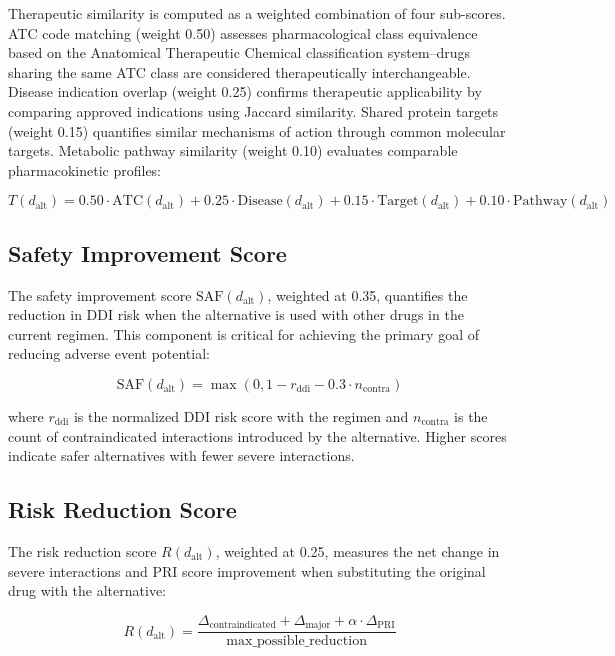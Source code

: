 \documentclass[11pt,a4paper]{article}
\begin{document}
Therapeutic similarity is computed as a weighted combination of four sub-scores. ATC code matching (weight 0.50) assesses pharmacological class equivalence based on the Anatomical Therapeutic Chemical classification system--drugs sharing the same ATC class are considered therapeutically interchangeable. Disease indication overlap (weight 0.25) confirms therapeutic applicability by comparing approved indications using Jaccard similarity. Shared protein targets (weight 0.15) quantifies similar mechanisms of action through common molecular targets. Metabolic pathway similarity (weight 0.10) evaluates comparable pharmacokinetic profiles:

\begin{equation}
T(d_{\text{alt}}) = 0.50 \cdot \text{ATC}(d_{\text{alt}}) + 0.25 \cdot \text{Disease}(d_{\text{alt}}) + 0.15 \cdot \text{Target}(d_{\text{alt}}) + 0.10 \cdot \text{Pathway}(d_{\text{alt}})
\end{equation}

\subsection{Safety Improvement Score}

The safety improvement score $\text{SAF}(d_{\text{alt}})$, weighted at 0.35, quantifies the reduction in DDI risk when the alternative is used with other drugs in the current regimen. This component is critical for achieving the primary goal of reducing adverse event potential:

\begin{equation}
\text{SAF}(d_{\text{alt}}) = \max\left(0, 1 - r_{\text{ddi}} - 0.3 \cdot n_{\text{contra}}\right)
\end{equation}

where $r_{\text{ddi}}$ is the normalized DDI risk score with the regimen and $n_{\text{contra}}$ is the count of contraindicated interactions introduced by the alternative. Higher scores indicate safer alternatives with fewer severe interactions.

\subsection{Risk Reduction Score}

The risk reduction score $R(d_{\text{alt}})$, weighted at 0.25, measures the net change in severe interactions and PRI score improvement when substituting the original drug with the alternative:

\begin{equation}
R(d_{\text{alt}}) = \frac{\Delta_{\text{contraindicated}} + \Delta_{\text{major}} + \alpha \cdot \Delta_{\text{PRI}}}{\text{max\_possible\_reduction}}
\end{equation}
\end{document}
